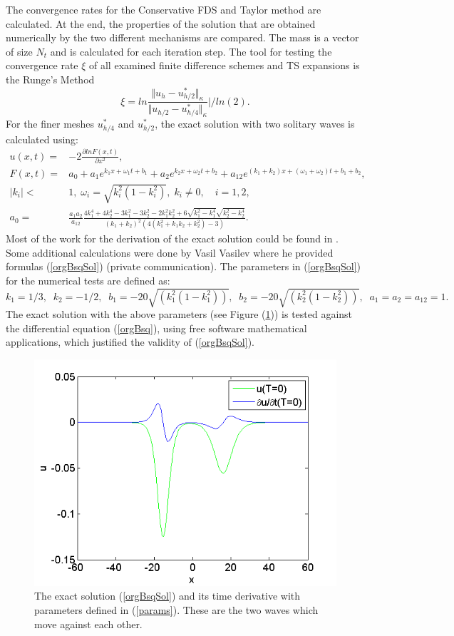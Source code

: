 \documentclass[%
 aip,
cp,  
 amsmath,amssymb,
 reprint,
]{iopconfser}
\newcommand{\be}{\begin{equation}}
\newcommand{\ee}{\end{equation}}
\newcommand{\rf}[1]{(\ref{#1})}
\begin{document}
The convergence rates for the Conservative FDS and Taylor method are calculated. At the end, the properties of the solution that are obtained numerically by the two different mechanisms are compared. The mass is a vector of size $N_t$ and is calculated for each iteration step. The tool for testing the convergence rate $\xi$ of all examined finite difference schemes and TS expansions is the Runge's Method
\begin{equation}\label{Runge}
\xi = ln  \frac{\Vert u_{h} - u^*_{h/2} \Vert_\kappa } {\Vert  u_{h/2} - u^*_{h/4} \Vert_\kappa  } | / ln(2).
\end{equation}
For the finer meshes $u^*_{h/4}$ and $u^*_{h/2}$, the exact solution with two solitary waves is calculated using:
\begin{align}\label{orgBsqSol}
u(x,t) =& -2 \frac{\partial ln F(x,t)}{\partial x^2},
\\
 F(x,t) =& a_0 + a_1 e^{k_1 x + \omega_1 t + b_1} + a_2 e^{k_2 x + \omega_2 t + b_2}  + a_{12} e^{(k_1 + k_2) x + (\omega_1 + \omega_2)  t + b_1 + b_2}, \nonumber
\\
|k_i| <& 1, \; \omega_i = \sqrt{k^2_i(1-k^2_i) }, \; k_i \neq 0, \quad i = 1,2, \nonumber
\\
a_0 =& \frac{a_1 a_2}{a_{12}}\frac{4k_1^4 + 4k_2^4 - 3k_1^2 - 3k_2^2 - 2k_1^2 k_2^2 + 6\sqrt{k_1^2-k_1^4}\sqrt{k_2^2-k_2^4} }{(k_1 + k_2)^2 (4(k_1^2 + k_1 k_2 + k_2^2) - 3)}.\nonumber
\end{align}
Most of the work for the derivation of the exact solution could be found in \cite{exactSol1, exactSol2}. Some additional calculations were done by Vasil Vasilev where he provided formulas \rf{orgBsqSol} (private communication). 
The parameters in \rf{orgBsqSol} for the numerical tests are defined as:
\be\label{params}
        k_1 = 1/3,  \;\; k_2 = -1/2,  \;\; b_1 = -20\sqrt{(k_1^ 2  (1 - k_1 ^ 2))}, \;\; b_2 = -20\sqrt{(k_2^ 2  (1 - k_2^2))},  \;\; a_1 = a_2 = a_{12} = 1.
\ee
The exact solution with the above parameters (see Figure \rf{ex_sol}) is tested against the differential equation \rf{orgBsq}, using free software mathematical applications, which justified the validity of \rf{orgBsqSol}.
\begin{figure}[ht]\vspace{0.2cm}
  \centering
  \includegraphics[width=0.5\linewidth]{IC.png}
\caption{The exact solution \rf{orgBsqSol} and its time derivative with parameters defined in \rf{params}. These are the two waves which move against each other. }
\label{ex_sol}
\end{figure}
\end{document}
